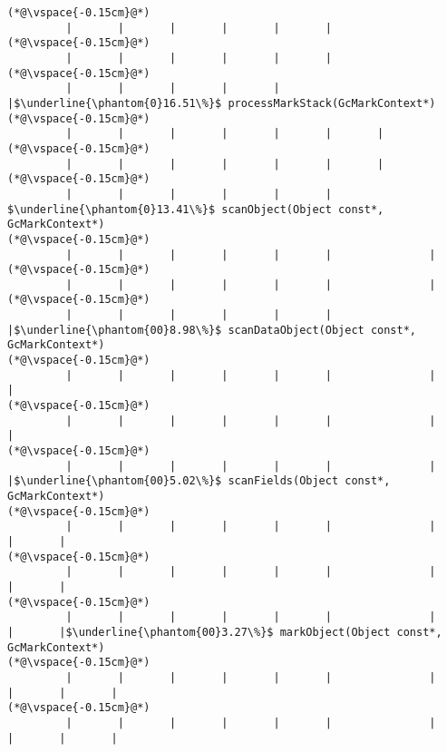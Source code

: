 \begin{lstlisting}[caption=NewDirectByteBuffer, label=profile:C2JNewDirectBuffer-512, numberbychapter=true, frame=lines, float, floatplacement=t]
(*@\vspace{-0.15cm}@*)
         |       |       |       |       |       |
(*@\vspace{-0.15cm}@*)
         |       |       |       |       |       |
(*@\vspace{-0.15cm}@*)
         |       |       |       |       |       |$\underline{\phantom{0}16.51\%}$ processMarkStack(GcMarkContext*)
(*@\vspace{-0.15cm}@*)
         |       |       |       |       |       |       |
(*@\vspace{-0.15cm}@*)
         |       |       |       |       |       |       |
(*@\vspace{-0.15cm}@*)
         |       |       |       |       |       |        $\underline{\phantom{0}13.41\%}$ scanObject(Object const*, GcMarkContext*)
(*@\vspace{-0.15cm}@*)
         |       |       |       |       |       |               |
(*@\vspace{-0.15cm}@*)
         |       |       |       |       |       |               |
(*@\vspace{-0.15cm}@*)
         |       |       |       |       |       |               |$\underline{\phantom{00}8.98\%}$ scanDataObject(Object const*, GcMarkContext*)
(*@\vspace{-0.15cm}@*)
         |       |       |       |       |       |               |       |
(*@\vspace{-0.15cm}@*)
         |       |       |       |       |       |               |       |
(*@\vspace{-0.15cm}@*)
         |       |       |       |       |       |               |       |$\underline{\phantom{00}5.02\%}$ scanFields(Object const*, GcMarkContext*)
(*@\vspace{-0.15cm}@*)
         |       |       |       |       |       |               |       |       |
(*@\vspace{-0.15cm}@*)
         |       |       |       |       |       |               |       |       |
(*@\vspace{-0.15cm}@*)
         |       |       |       |       |       |               |       |       |$\underline{\phantom{00}3.27\%}$ markObject(Object const*, GcMarkContext*)
(*@\vspace{-0.15cm}@*)
         |       |       |       |       |       |               |       |       |       |
(*@\vspace{-0.15cm}@*)
         |       |       |       |       |       |               |       |       |       |

\end{lstlisting}
